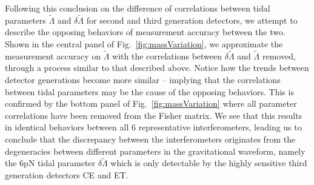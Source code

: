 \documentclass[prd,twocolumn,nofootinbib,superscriptaddress,amsmath,amssymb]{revtex4-1}
\begin{document}
Following this conclusion on the difference of correlations between tidal parameters $\tilde\Lambda$ and $\delta\tilde\Lambda$ for second and third generation detectors, we attempt to describe the opposing behaviors of measurement accuracy between the two.
Shown in the central panel of Fig.~\ref{fig:massVariation}, we approximate the measurement accuracy on $\tilde\Lambda$ with the correlations between $\delta\tilde\Lambda$ and $\tilde\Lambda$ removed, through a process similar to that described above. 
Notice how the trends between detector generations become more similar -- implying that the correlations between tidal parameters may be the cause of the opposing behaviors.
This is confirmed by the bottom panel of Fig.~\ref{fig:massVariation} where all parameter correlations have been removed from the Fisher matrix.
We see that this results in identical behaviors between all 6 representative interferometers, leading us to conclude that the discrepancy between the interferometers originates from the degeneracies between different parameters in the gravitational waveform, namely the 6pN tidal parameter $\delta\tilde\Lambda$ which is only detectable by the highly sensitive third generation detectors CE and ET.
\fi


\end{document}
